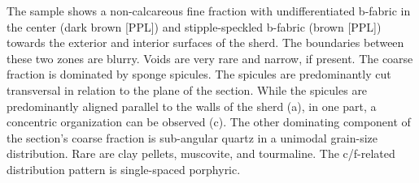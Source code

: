 \documentclass[a4paper]{article}
\begin{document}
\begin{multicols}{2}
\noindent The sample shows a non-calcareous fine fraction with undifferentiated b-fabric in the center (dark brown [PPL]) and stipple-speckled b-fabric (brown [PPL]) towards the exterior and interior surfaces of the sherd. The boundaries between these two zones are blurry. Voids are very rare and narrow, if present. The coarse fraction is dominated by sponge spicules. The spicules are predominantly cut transversal in relation to the plane of the section. While the spicules are predominantly aligned parallel to the walls of the sherd (a), in one part, a concentric organization can be observed (c). The other dominating component of the section's coarse fraction is sub-angular quartz in a unimodal grain-size distribution. Rare are clay pellets, muscovite, and tourmaline. The c/f-related distribution pattern is single-spaced porphyric.
\end{multicols}
\end{document}
